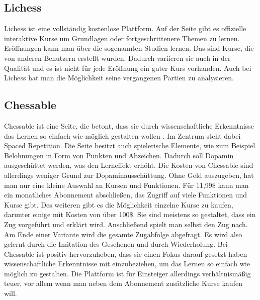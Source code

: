 \subsection{Lichess}
Lichess ist eine vollständig kostenlose Plattform. Auf der Seite gibt es offizielle interaktive Kurse um Grundlagen oder fortgeschrittenere Themen zu lernen. Eröffnungen kann man über die sogenannten Studien lernen. Das sind Kurse, die von anderen Benutzern erstellt wurden. Dadurch variieren sie auch in der Qualität und es ist nicht für jede Eröffnung ein guter Kurs vorhanden. Auch bei Lichess hat man die Möglichkeit seine vergangenen Partien zu analysieren.

\subsection{Chessable}
Chessable ist eine Seite, die betont, dass sie durch wissenschaftliche Erkenntnisse das Lernen so einfach wie möglich gestalten wollen \cite{prof_barry_hymer_science_nodate}. Im Zentrum steht dabei Spaced Repetition. Die Seite besitzt auch spielerische Elemente, wie zum Beispiel Belohnungen in Form von Punkten und Abzeichen.
Dadurch soll Dopamin ausgeschüttet werden, was den Lerneffekt erhöht.
Die Kosten von Chessable sind allerdings weniger Grund zur Dopaminausschüttung.
Ohne Geld auszugeben, hat man nur eine kleine Auswahl an Kursen und Funktionen.
Für 11,99\$ kann man ein monatliches Abonnement abschließen, das Zugriff auf viele Funktionen und Kurse gibt. Des weiteren gibt es die Möglichkeit einzelne Kurse zu kaufen, darunter einige mit Kosten von über 100\$.
Sie sind meistens so gestaltet, dass ein Zug vorgeführt und erklärt wird. Anschließend spielt man selbst den Zug nach. Am Ende einer Variante wird die gesamte Zugabfolge abgefragt. Es wird also gelernt durch die Imitation des Gesehenen und durch Wiederholung.
Bei Chessable ist positiv hervorzuheben, dass sie einen Fokus darauf gesetzt haben wissenschaftliche Erkenntnisse mit einzubeziehen, um das Lernen so einfach wie möglich zu gestalten. Die Plattform ist für Einsteiger allerdings verhältnismäßig teuer, vor allem wenn man neben dem Abonnement zusätzliche Kurse kaufen will.

